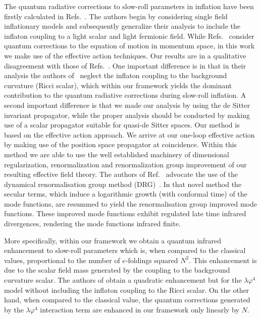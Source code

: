 The quantum radiative corrections to slow-roll parameters in inflation have
been firstly calculated in
Refs.~\cite{BoyanovskydeVegaSanchez:2006,BoyanovskydeVegaSanchez:2005,Boyanovsky:2004ph}.
The authors begin by considering single field inflationary models
and subsequently generalize their analysis to include the inflaton
coupling to a light scalar and light fermionic field. While
Refs.~\cite{BoyanovskydeVegaSanchez:2006,BoyanovskydeVegaSanchez:2005}
consider quantum corrections to the equation of motion in momentum space, 
in this work we make use of the effective action techniques.
 Our results are in a qualitative disagreement with those of
Refs.~\cite{BoyanovskydeVegaSanchez:2006,BoyanovskydeVegaSanchez:2005,Boyanovsky:2004ph}.
One important difference is in that in their analysis the authors 
of~\cite{BoyanovskydeVegaSanchez:2006,BoyanovskydeVegaSanchez:2005,Boyanovsky:2004ph}
neglect the inflaton coupling to the background curvature (Ricci scalar), 
which within our framework yields the dominant contribution 
to the quantum radiative corrections during slow-roll inflation.
 A second important difference is that we made our analysis by using 
the de Sitter invariant propagator, while the proper analysis should be
conducted by making use of a scalar propagator suitable for
quasi-de Sitter spaces. Our method is based on the effective action 
approach. We arrive at our one-loop effective action
by making use of the position space propagator at coincidence.
Within this method we are able to use the well established
machinery of dimensional regularization, renormalization and
renormalization group improvement of our resulting effective field theory.
The authors of Ref.~\cite{Boyanovsky:2004ph} advocate the use of the
dynamical renormalisation group method (DRG)~\cite{Boyanovsky:2004gq}.
In that novel method the secular terms, which induce
a logarithmic growth (with conformal time) of the mode functions,
are resummed to yield the renormalisation group improved mode functions.
These improved mode functions exhibit regulated late time infrared divergences,
rendering the mode functions infrared finite. 

 More specifically, within our framework we obtain
 a quantum infrared enhancement to slow-roll parameters which is,
when compared to the classical values,
proportional to the number of $e$-foldings squared $N^2$. 
This enhancement is due to the scalar field mass generated by the coupling
to the background curvature scalar.
The authors
of \cite{BoyanovskydeVegaSanchez:2006,BoyanovskydeVegaSanchez:2005,Boyanovsky:2004ph}
obtain a quadratic enhancement but for the $\lambda\varphi^4$ model
without including the inflaton coupling to the Ricci scalar.
On the other hand, when compared to the classical value, 
the quantum corrections generated by the $\lambda\varphi^4$ 
interaction term are enhanced in our framework only linearly by $N$.

